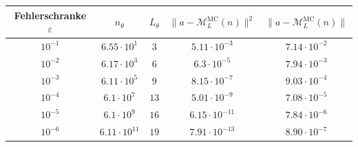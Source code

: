 \documentclass{standalone}
\begin{document}
\begin{tabular}{c|c|c|c|c}
Fehlerschranke $\varepsilon$ & $n_\theta$ & $L_\theta$ & $\|a-\mathcal{M}_L^{\text{MC}}(n)\|^2$ & $\|a-\mathcal{M}_L^{\text{MC}}(n)\|$\\
\hline
$10^{-1}$  &  $6.55 \cdot 10^{1}$ &   $3$  &  $5.11 \cdot 10^{-3}$ & $7.14 \cdot 10^{-2}$\\
$10^{-2}$    & $6.17 \cdot 10^{3}$ &   $6$  &  $6.3 \cdot 10^{-5}$ & $7.94 \cdot 10^{-3}$ \\
$10^{-3}$    & $6.11 \cdot 10^{5}$  &  $9$  &  $8.15 \cdot 10^{-7}$  & $9.03 \cdot 10^{-4}$\\
$10^{-4}$    &  $6.1 \cdot 10^{7}$ &   $13$  &  $5.01 \cdot 10^{-9}$ & $7.08 \cdot 10^{-5}$\\
$10^{-5}$ &   $6.1 \cdot 10^{9}$ &   $16$ &   $6.15 \cdot 10^{-11}$ & $7.84 \cdot 10^{-6}$\\
$10^{-6}$&   $6.11 \cdot 10^{11}$  &  $19$  &  $7.91 \cdot 10^{-13}$ & $8.90 \cdot 10^{-7}$\\ 
\hline 
 \end{tabular}
\end{document}

